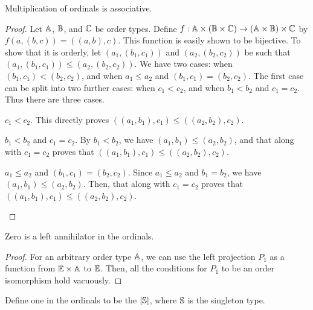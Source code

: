 \documentclass[../../math.tex]{subfiles}
\begin{document}
\begin{instance}
    Multiplication of ordinals is associative.
\end{instance}
\begin{proof}
    Let $\A$, $\B$, and $\C$ be order types.  Define $f : \A \times (\B \times
    \C) \to (\A \times \B) \times \C$ by $f(a, (b, c)) = ((a, b), c)$.  This
    function is easily shown to be bijective.  To show that it is orderly, let
    $(a_1, (b_1, c_1))$ and $(a_2, (b_2, c_2))$ be such that $(a_1, (b_1, c_1))
    \leq (a_2, (b_2, c_2))$.  We have two cases: when $(b_1, c_1) < (b_2, c_2)$,
    and when $a_1 \leq a_2$ and $(b_1, c_1) = (b_2, c_2)$.  The first case can
    be split into two further cases: when $c_1 < c_2$, and when $b_1 < b_2$ and
    $c_1 = c_2$.  Thus there are three cases.
    \setcounter{case}{0}
    \begin{case} $c_1 < c_2$.
        This directly proves $((a_1, b_1), c_1) \leq ((a_2, b_2), c_2)$.
    \end{case}
    \begin{case} $b_1 < b_2$ and $c_1 = c_2$.
        By $b_1 < b_2$, we have $(a_1, b_1) \leq (a_2, b_2)$, and that along
        with $c_1 = c_2$ proves that $((a_1, b_1), c_1) \leq ((a_2, b_2), c_2)$.
    \end{case}
    \begin{case} $a_1 \leq a_2$ and $(b_1, c_1) = (b_2, c_2)$.
        Since $a_1 \leq a_2$ and $b_1 = b_2$, we have $(a_1, b_1) \leq (a_2,
        b_2)$.  Then, that along with $c_1 = c_2$ proves that $((a_1, b_1), c_1)
        \leq ((a_2, b_2), c_2)$.
    \end{case}
\end{proof}

\begin{instance}
    Zero is a left annihilator in the ordinals.
\end{instance}
\begin{proof}
    For an arbitrary order type $\A$, we can use the left projection $P_1$ as a
    function from $\E \times \A$ to $\E$.  Then, all the conditions for $P_1$ to
    be an order isomorphism hold vacuously.
\end{proof}

\begin{instance}
    Define one in the ordinals to be the $[\S]$, where $\S$ is the singleton
    type.
\end{instance}
\end{document}

